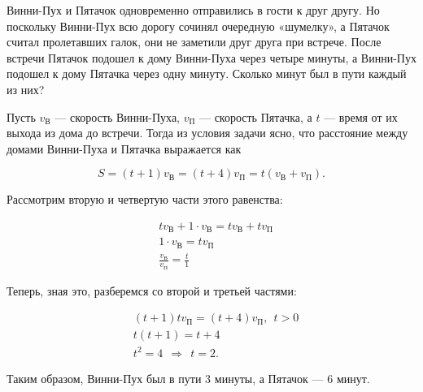 \begin{itemize}

\itB Винни-Пух и Пятачок одновременно отправились в гости к друг другу. Но поскольку Винни-Пух всю дорогу сочинял очередную «шумелку», а Пятачок считал пролетавших галок, они не заметили друг друга при встрече. После встречи Пятачок подошел к дому Винни-Пуха через четыре минуты, а Винни-Пух подошел к дому Пятачка через одну минуту. Сколько минут был в пути каждый из них?

\def\vv{v_\text{В}} \def\vp{v_\text{П}}
\itr Пусть $\vv$ — скорость Винни-Пуха, $\vp$ — скорость Пятачка, а $t$ — время от их выхода из дома до встречи. Тогда из условия задачи ясно, что расстояние между домами Винни-Пуха и Пятачка выражается как

\vspace{-0.4cm}
$$S = (t+1)\vv = (t+4)\vp = t(\vv+\vp).$$

Рассмотрим вторую и четвертую части этого равенства:

\begin{align*}
	& t\vv + 1 \cdot \vv = t\vv + t\vp \\
	& 1 \cdot \vv = t \vp \\
	& \frac{\vv}{\vp} = \frac{t}{1}
\end{align*}

Теперь, зная это, разберемся со второй и третьей частями:

\begin{align*}
	& (t+1)t\vp = (t+4)\vp,\ \ t>0 \\
	& t(t+1) = t+4 \\
	& t^2 = 4\ \ \Longrightarrow\ \ t=2.
\end{align*}


Таким образом, Винни-Пух был в пути 3 минуты, а Пятачок — 6 минут.
\end{itemize}

